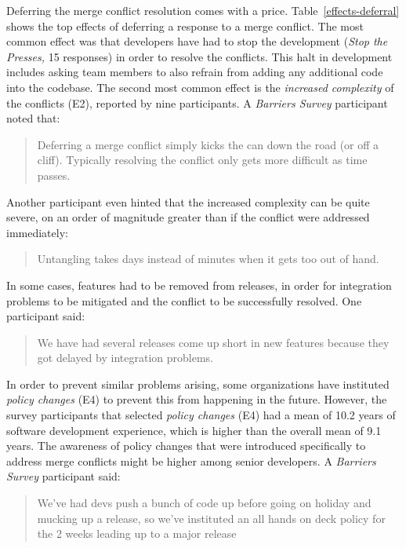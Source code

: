 Deferring the merge conflict resolution comes with a price.
Table~\ref{effects-deferral} shows the top effects of deferring a response to a merge conflict.
The most common effect was that developers have had to stop the development (\emph{Stop the Presses,} 15 responses) in order to resolve the conflicts.
This halt in development includes asking team members to also refrain from adding any additional code into the codebase.
The second most common effect is the \textit{increased complexity} of the conflicts (E2), reported by nine participants.
A \textit{Barriers Survey} participant noted that:
\begin{quotation}
	Deferring a merge conflict simply kicks the can down the road (or off a cliff). Typically resolving the conflict only gets more difficult as time passes.
\end{quotation}
Another participant even hinted that the increased complexity can be quite severe, on an order of magnitude greater than if the conflict were addressed immediately:
\begin{quotation}
	Untangling takes days instead of minutes when it gets too out of hand.
\end{quotation}
In some cases, features had to be removed from releases, in order for integration problems to be mitigated and the conflict to be successfully resolved. One participant said:
\begin{quotation}
	We have had several releases come up short in new features because they got delayed by integration problems.
\end{quotation}
In order to prevent similar problems arising, some organizations have instituted \textit{policy changes} (E4) to prevent this from happening in the future.
However, the survey participants that selected \textit{policy changes} (E4) had a mean of 10.2 years of software development experience, which is higher than the overall mean of 9.1 years.
The awareness of policy changes that were introduced specifically to address merge conflicts might be higher among senior developers.
A \textit{Barriers Survey} participant said:
\begin{quotation}
	We've had devs push a bunch of code up before going on holiday and mucking up a release, so we've instituted an all hands on deck policy for the 2 weeks leading up to a major release
\end{quotation}

